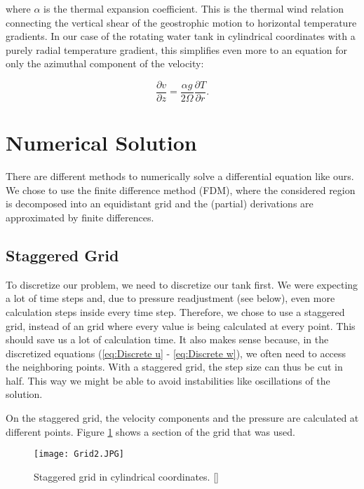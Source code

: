 \documentclass[12pt, a4paper]{article} %
\begin{document}
		where $\alpha$ is the thermal expansion coefficient. This is the thermal wind relation connecting the vertical shear of the geostrophic motion to horizontal temperature gradients. In our case of the rotating water tank in cylindrical coordinates with a purely radial temperature gradient, this simplifies even more to an equation for only the azimuthal component of the velocity:
		
		\begin{equation}
			\frac{\partial v}{\partial z} = \frac{\alpha g}{2\Omega} \frac{\partial T}{\partial r} .
			\label{eq:Thermal Wind}
		\end{equation}
		
	\newpage		
\section{Numerical Solution
}
	There are different methods to numerically solve a differential equation like ours. We chose to use the finite difference method (FDM), where the considered region is decomposed into an equidistant grid and the (partial) derivations are approximated by finite differences.
	
	
	\subsection{Staggered Grid} %
		To discretize our problem, we need to discretize our tank first. We were expecting a lot of time steps and, due to pressure readjustment (see below), even more calculation steps inside every time step. Therefore, we chose to use a staggered grid, instead of an grid where every value is being calculated at every point. This should save us a lot of calculation time. It also makes sense because, in the discretized equations (\ref{eq:Discrete u} - \ref{eq:Discrete w}), we often need to access the neighboring points. With a staggered grid, the step size can thus be cut in half. This way we might be able to avoid instabilities like oscillations of the solution.
		
		On the staggered grid, the velocity components and the pressure are calculated at different points. Figure \ref{fig:Grid} shows a section of the grid that was used.
		
		\begin{figure}[H]
			\centering
			\texttt{[image: Grid2.JPG]}
			\caption{Staggered grid in cylindrical coordinates. [\cite{GridFigURL}]} %
			\label{fig:Grid}
		\end{figure}
		
\end{document}
